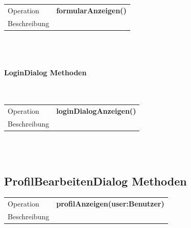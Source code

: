 \documentclass[12pt]{scrreprt}
\begin{document}
\begin{tabular}{|lp{12cm}|}
	\hline
	Operation &  \textbf{formularAnzeigen()}\\ 
	Beschreibung & \\ 
	\hline 
\end{tabular} \\\\

\paragraph{LoginDialog  Methoden}\mbox{}\\

\begin{tabular}{|lp{12cm}|}
	\hline
	Operation &  \textbf{loginDialogAnzeigen()}\\ 
	Beschreibung & \\ 
	\hline 
\end{tabular} \\\\

\subsection{ProfilBearbeitenDialog  Methoden}

\begin{tabular}{|lp{12cm}|}
	\hline
	Operation &  \textbf{profilAnzeigen(user:Benutzer)}\\ 
	Beschreibung & \\ 
	\hline 
\end{tabular} \\\\
\end{document}
